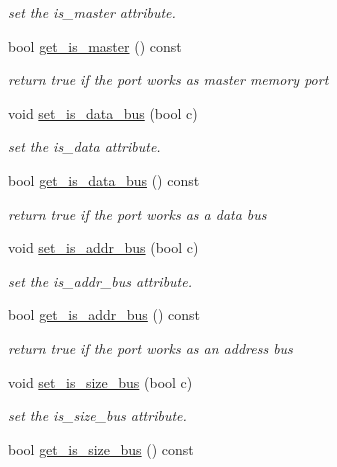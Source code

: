 \begin{DoxyCompactItemize}
\begin{DoxyCompactList}\small\item\em set the is\+\_\+master attribute. \end{DoxyCompactList}\item 
bool \hyperlink{structport__o_abaa71816b5d12be2039da28f35dbf28c}{get\+\_\+is\+\_\+master} () const
\begin{DoxyCompactList}\small\item\em return true if the port works as master memory port \end{DoxyCompactList}\item 
void \hyperlink{structport__o_adf58a4044d3732e7e1471f313556f477}{set\+\_\+is\+\_\+data\+\_\+bus} (bool c)
\begin{DoxyCompactList}\small\item\em set the is\+\_\+data attribute. \end{DoxyCompactList}\item 
bool \hyperlink{structport__o_a35f8ee2310598883a7e663532235a6e0}{get\+\_\+is\+\_\+data\+\_\+bus} () const
\begin{DoxyCompactList}\small\item\em return true if the port works as a data bus \end{DoxyCompactList}\item 
void \hyperlink{structport__o_ae5919d0b07ba4a89838f333beb5e6a34}{set\+\_\+is\+\_\+addr\+\_\+bus} (bool c)
\begin{DoxyCompactList}\small\item\em set the is\+\_\+addr\+\_\+bus attribute. \end{DoxyCompactList}\item 
bool \hyperlink{structport__o_a6689eba936defd0e9ba9b981ddb89e97}{get\+\_\+is\+\_\+addr\+\_\+bus} () const
\begin{DoxyCompactList}\small\item\em return true if the port works as an address bus \end{DoxyCompactList}\item 
void \hyperlink{structport__o_a6b4ec368011ad23c091231c7bb0dc48b}{set\+\_\+is\+\_\+size\+\_\+bus} (bool c)
\begin{DoxyCompactList}\small\item\em set the is\+\_\+size\+\_\+bus attribute. \end{DoxyCompactList}\item 
bool \hyperlink{structport__o_ae1a8168623582541d977dda80d73461c}{get\+\_\+is\+\_\+size\+\_\+bus} () const

\end{DoxyCompactItemize}

